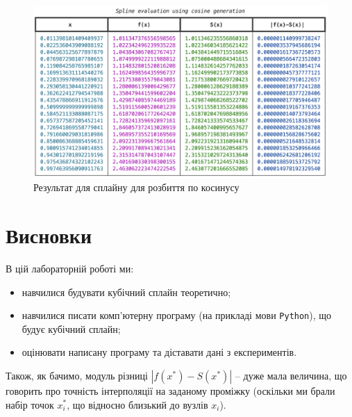 \documentclass[12pt]{extarticle}
\begin{document}
\begin{figure}[H]
    \centering
    \includegraphics[width=\textwidth]{images/lab_2/spline_cosine.png}
    \caption{Результат для сплайну для розбиття по косинусу}
    \label{fig:3}
\end{figure}
\vspace{5px}

\pagebreak
\section{Висновки}

В цій лабораторній роботі ми:
\begin{itemize}
\item навчилися будувати кубічний сплайн теоретично;
\item навчилися писати комп'ютерну програму (на прикладі мови \texttt{Python}), що будує кубічний сплайн;
\item оцінювати написану програму та діставати дані з експериментів.
\end{itemize}

Також, як бачимо, модуль різниці $|f(x^*)-S(x^*)|$ -- дуже мала величина, що говорить про точність інтерполяції на заданому проміжку (оскільки ми брали набір точок $x^*_i$, що відносно близький до вузлів $x_i$).
\end{document}
